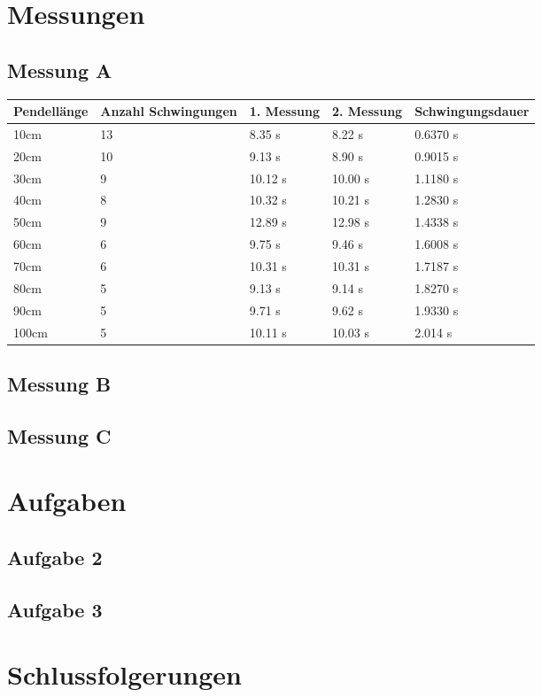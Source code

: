 \documentclass{report}
\begin{document}
    \chapter*{Messungen}
    \section*{Messung A}
    \begin{center}
        \begin{tabular}{ | m{5em} | m{4cm}| m{2cm} | m{2cm} | m{3cm} | }
            \hline
            Pendellänge & Anzahl Schwingungen &1. Messung & 2. Messung & Schwingungsdauer\\ 
            \hline
            10cm & 13 & 8.35 s & 8.22 s & 0.6370 s\\ 
            \hline
            20cm & 10 & 9.13 s & 8.90 s & 0.9015 s \\ 
            \hline
            30cm & 9 & 10.12 s & 10.00 s & 1.1180 s \\ 
            \hline
            40cm & 8 & 10.32 s & 10.21 s & 1.2830 s \\ 
            \hline
            50cm & 9 & 12.89 s & 12.98 s & 1.4338 s \\ 
            \hline
            60cm & 6 & 9.75 s & 9.46 s & 1.6008 s \\ 
            \hline
            70cm & 6 & 10.31 s & 10.31 s & 1.7187 s \\ 
            \hline
            80cm & 5 & 9.13 s & 9.14 s & 1.8270 s \\ 
            \hline
            90cm & 5 & 9.71 s & 9.62 s & 1.9330 s \\ 
            \hline
            100cm & 5 & 10.11 s & 10.03 s & 2.014 s \\ 
            \hline

          \end{tabular}
    \end{center}
    \section*{Messung B}
    \section*{Messung C}
    \chapter*{Aufgaben}
    \section*{Aufgabe 2}
    \section*{Aufgabe 3}
    \chapter*{Schlussfolgerungen}
\end{document}
